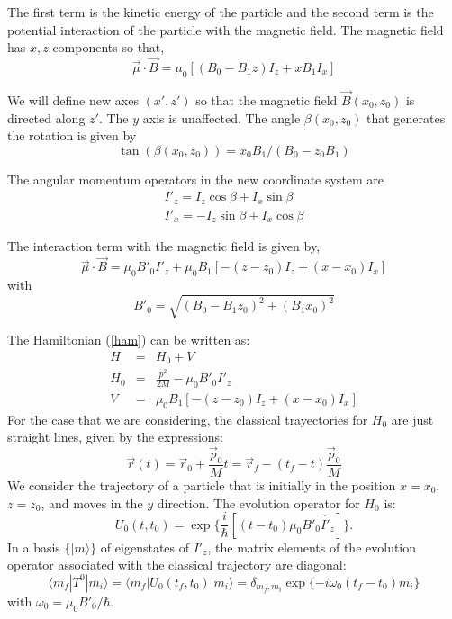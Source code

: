 \documentclass[aps,preprint,prl]{revtex4-2}
\newcommand{\be}{\begin{equation}}
\newcommand{\ee}{\end{equation}}
\newcommand{\ba}{\begin{eqnarray}}
\newcommand{\ea}{\end{eqnarray}}
\begin{document}
The first term is the kinetic energy of the particle and the second term
is the potential interaction of the particle with the magnetic field.  
The  magnetic field has  $x, z$ components so that, 
\be
\vec{\mu}\cdot \vec{B} = \mu_0[(B_0 - B_1 z){I}_z + x B_1 {I}_x]
\ee 

We will 
define new axes $(x', z')$ so that the magnetic field
$\vec B(x_0,z_0)$ is directed along $z'$. The $y$ axis is unaffected.
The angle  $\beta(x_0,z_0) $ that  
generates the rotation  is given by
\be
\tan(\beta(x_0,z_0)) = x_0 B_1 / (B_0 - z_0 B_1)
\ee

The angular momentum operators in the new coordinate system are
\ba
{I'}_z = {I}_z \cos \beta + {I}_x \sin \beta \nonumber \\
{I'}_x = -{I}_z \sin \beta + {I}_x \cos \beta 
\ea \label{irot}

The  interaction term with the magnetic field is given by, 
\be
\vec{\mu}\cdot \vec{B} = \mu_0 B'_0 {I'}_z + \mu_0 B_1 [-(z-z_0){I}_z+
(x-x_0)I_x]
\ee 
with 
\be B'_0 = \sqrt{ (B_0 - B_1 z_0)^2 + (B_1 x_0)^2} \ee


The Hamiltonian (\ref{ham}) can be written  as:
\ba 
H &=& H_0 + V \\ 
H_0 &=& \frac{p^2}{2M} - \mu_0 B'_0 {I'}_z \\ 
V &=&  \mu_0 B_1 [-(z-z_0)I_z+
(x-x_0)I_x]
\ea
For the case that we are considering, the classical trayectories for $ H_0$ 
are just straight lines,  given by the expressions:
\be
\vec{r}(t) =  \vec{r}_0 + \frac{ \vec{p}_0}{M}t  = 
\vec{r}_f - (t_f - t) \frac{\vec{p}_0}{M} \label{ecr}
\ee
We consider the trajectory of a particle that is initially in the position 
$x=x_0$, $z=z_0$, and
moves in the $y$ direction. The evolution operator for $H_0$   is: 
\be 
{U}_0(t,t_0) = \exp \{ \frac{i}{\hbar}[ (t-t_0) \mu_0 B'_0 \hat{I'}_z ]\}.
\ee
In a basis $\{| m \rangle\}$ of eigenstates of $I'_z$, 
the matrix elements of the evolution operator
 associated with the classical trajectory are diagonal:
\be
\langle m_f|T^0|m_i \rangle = \langle m_f |U_0(t_f,t_0) |m_i \rangle = \delta_{m_f,m_i} \exp 
\{- i \omega_0(t_f - t_0)m_i \}
\ee 
with $\omega_0 = \mu_0 B'_0 /\hbar $. 
\end{document}
